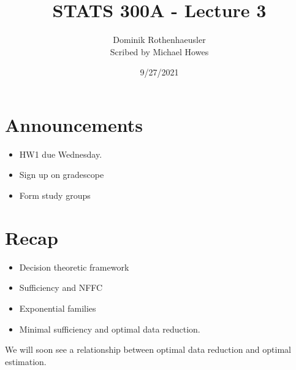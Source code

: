 




\title{STATS 300A - Lecture 3}
\author{Dominik Rothenhaeusler\\
Scribed by Michael Howes}
\date{9/27/2021}

\pagestyle{fancy}
\fancyhf{}


\maketitle
\section{Announcements}
\begin{itemize}
    \item HW1 due Wednesday.
    \item Sign up on gradescope
    \item Form study groups
\end{itemize}
\section{Recap}
\begin{itemize}
    \item Decision theoretic framework
    \item Sufficiency and NFFC
    \item Exponential families
    \item Minimal sufficiency and optimal data reduction.
\end{itemize}
We will soon see a relationship between optimal data reduction and optimal estimation.

